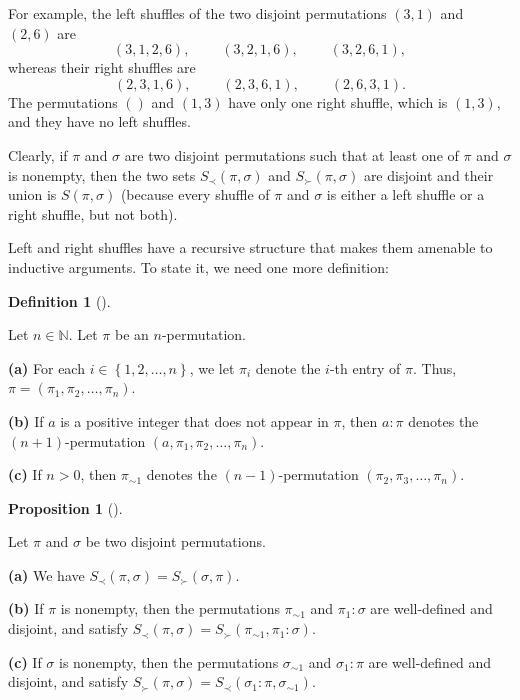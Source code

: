 \documentclass[numbers=enddot,12pt,final,onecolumn,notitlepage]{scrartcl}%
\theoremstyle{definition}
\newtheorem{prop}[theo]{Proposition}
\newenvironment{proposition}[1][]
{\begin{prop}[#1]\begin{leftbar}}
{\end{leftbar}\end{prop}}
\newtheorem{defi}[theo]{Definition}
\newenvironment{definition}[1][]
{\begin{defi}[#1]\begin{leftbar}}
{\end{leftbar}\end{defi}}
\begin{document}
For example, the left shuffles of the two disjoint permutations $\left(
3,1\right)  $ and $\left(  2,6\right)  $ are%
\[
\left(  3,1,2,6\right)  ,\ \ \ \ \ \ \ \ \ \ \left(  3,2,1,6\right)
,\ \ \ \ \ \ \ \ \ \ \left(  3,2,6,1\right)  ,
\]
whereas their right shuffles are%
\[
\left(  2,3,1,6\right)  ,\ \ \ \ \ \ \ \ \ \ \left(  2,3,6,1\right)
,\ \ \ \ \ \ \ \ \ \ \left(  2,6,3,1\right)  .
\]
The permutations $\left(  {}\right)  $ and $\left(  1,3\right)  $ have only
one right shuffle, which is $\left(  1,3\right)  $, and they have no left shuffles.

Clearly, if $\pi$ and $\sigma$ are two disjoint permutations such that at
least one of $\pi$ and $\sigma$ is nonempty, then the two sets $S_{\prec
}\left(  \pi,\sigma\right)  $ and $S_{\succ}\left(  \pi,\sigma\right)  $ are
disjoint and their union is $S\left(  \pi,\sigma\right)  $ (because every
shuffle of $\pi$ and $\sigma$ is either a left shuffle or a right shuffle, but
not both).

Left and right shuffles have a recursive structure that makes them amenable to
inductive arguments. To state it, we need one more definition:

\begin{definition}
Let $n\in\mathbb{N}$. Let $\pi$ be an $n$-permutation.

\textbf{(a)} For each $i\in\left\{  1,2,\ldots,n\right\}  $, we let $\pi_{i}$
denote the $i$-th entry of $\pi$. Thus, $\pi=\left(  \pi_{1},\pi_{2}%
,\ldots,\pi_{n}\right)  $.

\textbf{(b)} If $a$ is a positive integer that does not appear in $\pi$, then
$a:\pi$ denotes the $\left(  n+1\right)  $-permutation $\left(  a,\pi_{1}%
,\pi_{2},\ldots,\pi_{n}\right)  $.

\textbf{(c)} If $n>0$, then $\pi_{\sim1}$ denotes the $\left(  n-1\right)
$-permutation $\left(  \pi_{2},\pi_{3},\ldots,\pi_{n}\right)  $.
\end{definition}

\begin{proposition}
\label{prop.LR.rec}Let $\pi$ and $\sigma$ be two disjoint permutations.

\textbf{(a)} We have $S_{\prec}\left(  \pi,\sigma\right)  =S_{\succ}\left(
\sigma,\pi\right)  $.

\textbf{(b)} If $\pi$ is nonempty, then the permutations $\pi_{\sim1}$ and
$\pi_{1}:\sigma$ are well-defined and disjoint, and satisfy $S_{\prec}\left(
\pi,\sigma\right)  =S_{\succ}\left(  \pi_{\sim1},\pi_{1}:\sigma\right)  $.

\textbf{(c)} If $\sigma$ is nonempty, then the permutations $\sigma_{\sim1}$
and $\sigma_{1}:\pi$ are well-defined and disjoint, and satisfy $S_{\succ
}\left(  \pi,\sigma\right)  =S_{\prec}\left(  \sigma_{1}:\pi,\sigma_{\sim
1}\right)  $.
\end{proposition}
\end{document}
